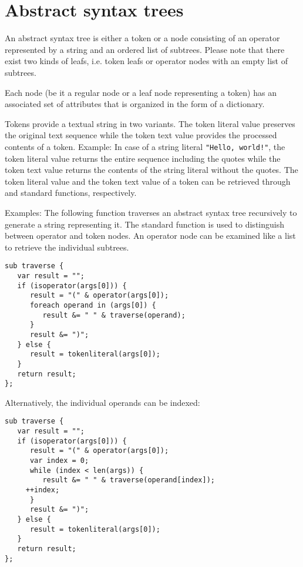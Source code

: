 \section{Abstract syntax trees}

An abstract syntax tree is either a token or a
node consisting of an operator
represented by a string and an ordered list of subtrees.
Please note that there exist two kinds of leafs, i.e. token
leafs or operator nodes with an empty list of subtrees.

Each node (be it a regular node or a leaf node representing a token)
has an associated set of attributes that is organized in the form
of a dictionary.

Tokens provide a textual string in two variants. The token
literal value preserves the original
text sequence while the token text value
provides the processed contents of a token. Example: In case of a
string literal \lstinline+"Hello, world!"+, the token literal value
returns the entire sequence including the quotes while the token
text value returns the contents of the string literal without the
quotes. The token literal value and the token text value of a token
can be retrieved through  and
 standard functions, respectively.

Examples: The following function  traverses an
abstract syntax tree recursively to generate a string representing it.
The standard function  is used to distinguish between
operator and token nodes. An operator node can be examined like a list
to retrieve the individual subtrees.

\begin{lstlisting}
sub traverse {
   var result = "";
   if (isoperator(args[0])) {
      result = "(" & operator(args[0]);
      foreach operand in (args[0]) {
         result &= " " & traverse(operand);
      }
      result &= ")";
   } else {
      result = tokenliteral(args[0]);
   }
   return result;
};
\end{lstlisting}

\noindent
Alternatively, the individual operands can be indexed:

\begin{lstlisting}
sub traverse {
   var result = "";
   if (isoperator(args[0])) {
      result = "(" & operator(args[0]);
      var index = 0;
      while (index < len(args)) {
         result &= " " & traverse(operand[index]);
	 ++index;
      }
      result &= ")";
   } else {
      result = tokenliteral(args[0]);
   }
   return result;
};
\end{lstlisting}

